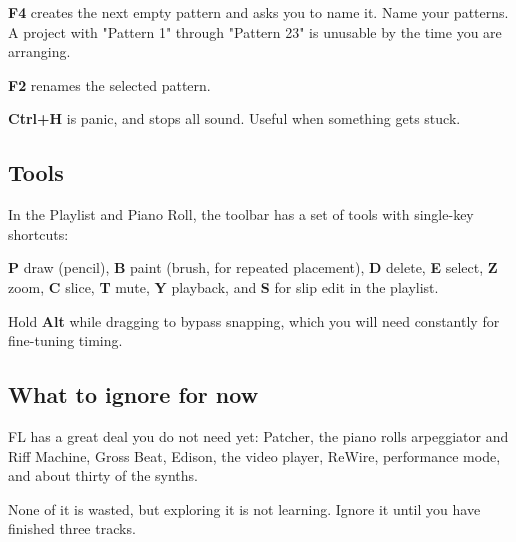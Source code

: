\textbf{F4} creates the next empty pattern and asks you to name it. Name your patterns. A project
with "Pattern 1" through "Pattern 23" is unusable by the time you are arranging.

\textbf{F2} renames the selected pattern.

\textbf{Ctrl+H} is panic, and stops all sound. Useful when something gets stuck.

\subsection{Tools}\label{fl01_interface-tools}

In the Playlist and Piano Roll, the toolbar has a set of tools with single-key shortcuts:

\textbf{P} draw (pencil), \textbf{B} paint (brush, for repeated placement), \textbf{D} delete, \textbf{E} select,
\textbf{Z} zoom, \textbf{C} slice, \textbf{T} mute, \textbf{Y} playback, and \textbf{S} for slip edit in the playlist.

Hold \textbf{Alt} while dragging to bypass snapping, which you will need constantly for
fine-tuning timing.

\subsection{What to ignore for now}\label{fl01_interface-what-to-ignore-for-now}

FL has a great deal you do not need yet: Patcher, the piano roll\textquotesingle s arpeggiator and Riff
Machine, Gross Beat, Edison, the video player, ReWire, performance mode, and about thirty
of the synths.

None of it is wasted, but exploring it is not learning. Ignore it until you have finished
three tracks.
